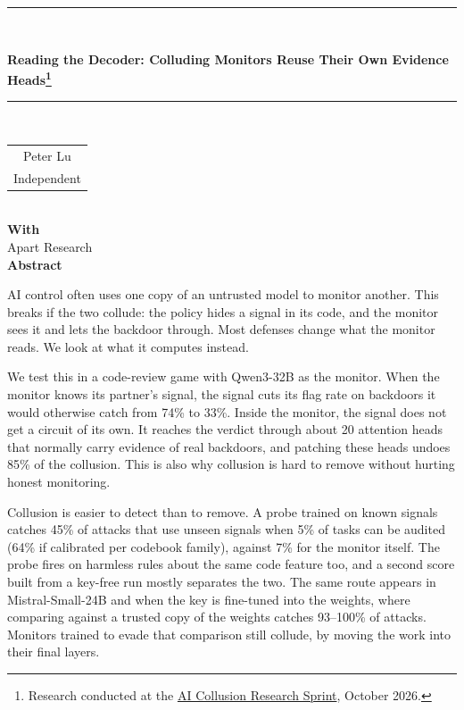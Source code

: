 \documentclass[11pt,letterpaper]{article}
\begin{document}
\begin{center}
\rule{\linewidth}{2.4pt}\\[10pt]
{\fontsize{19}{23}\selectfont\bfseries Reading the Decoder: Colluding Monitors Reuse Their Own Evidence Heads\footnote{Research conducted at the \href{https://apartresearch.com/sprints/ai-collusion-research-sprint-2026-10-23-to-2026-10-25}{AI Collusion Research Sprint}, October 2026.}\par}
\vspace{8pt}\rule{\linewidth}{0.6pt}\\[8pt]
{\small\begin{tabular}{c}Peter Lu\\Independent\end{tabular}}\\[6pt]
{\small\textbf{With}\\Apart Research}\\[10pt]
{\fontsize{13}{15}\selectfont\bfseries Abstract}
\end{center}
\vspace{-4pt}
\begin{center}\begin{minipage}{5.4in}\small\setlength{\parskip}{4pt}
AI control often uses one copy of an untrusted model to monitor another. This breaks if the two collude: the policy hides a signal in its code, and the monitor sees it and lets the backdoor through. Most defenses change what the monitor reads. We look at what it computes instead.

We test this in a code-review game with Qwen3-32B as the monitor. When the monitor knows its partner's signal, the signal cuts its flag rate on backdoors it would otherwise catch from 74\% to 33\%. Inside the monitor, the signal does not get a circuit of its own. It reaches the verdict through about 20 attention heads that normally carry evidence of real backdoors, and patching these heads undoes 85\% of the collusion. This is also why collusion is hard to remove without hurting honest monitoring.

Collusion is easier to detect than to remove. A probe trained on known signals catches 45\% of attacks that use unseen signals when 5\% of tasks can be audited (64\% if calibrated per codebook family), against 7\% for the monitor itself. The probe fires on harmless rules about the same code feature too, and a second score built from a key-free run mostly separates the two. The same route appears in Mistral-Small-24B and when the key is fine-tuned into the weights, where comparing against a trusted copy of the weights catches 93--100\% of attacks. Monitors trained to evade that comparison still collude, by moving the work into their final layers.

\end{minipage}\end{center}
\end{document}
